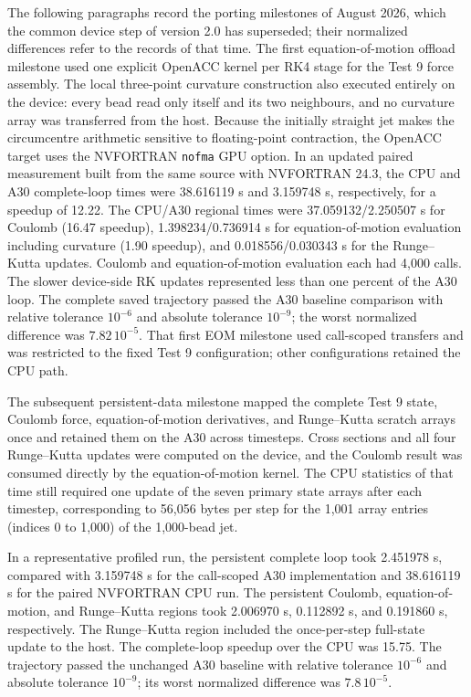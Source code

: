 The following paragraphs record the porting milestones of August 2026,
which the common device step of version 2.0 has superseded; their normalized
differences refer to the records of that time. The first
equation-of-motion offload milestone used one explicit OpenACC
kernel per RK4 stage for the Test 9 force assembly. The local three-point
curvature construction also executed entirely on the device: every bead read
only itself and its two neighbours, and no curvature array was transferred from
the host. Because the initially straight jet makes the circumcentre arithmetic
sensitive to floating-point contraction, the OpenACC target uses the
NVFORTRAN \texttt{nofma} GPU option. In an updated paired measurement built
from the same source with NVFORTRAN 24.3, the CPU and A30 complete-loop times
were 38.616119 s and 3.159748 s, respectively, for a speedup of 12.22. The
CPU/A30 regional times were 37.059132/2.250507 s for Coulomb (16.47 speedup),
1.398234/0.736914 s for equation-of-motion evaluation including curvature
(1.90 speedup), and 0.018556/0.030343 s for the Runge--Kutta updates. Coulomb
and equation-of-motion evaluation each had 4,000 calls. The slower device-side
RK updates represented less than one percent of the A30 loop. The complete
saved trajectory passed the
A30 baseline comparison with relative tolerance $10^{-6}$ and absolute
tolerance $10^{-9}$; the worst normalized difference was $7.82\,10^{-5}$.
That first EOM milestone used call-scoped transfers and was restricted to the fixed Test 9
configuration; other configurations retained the CPU path.

The subsequent persistent-data milestone mapped the complete Test 9 state,
Coulomb force, equation-of-motion derivatives, and Runge--Kutta scratch arrays
once and retained them on the A30 across timesteps. Cross sections and all four
Runge--Kutta updates were computed on the device, and the Coulomb result was
consumed directly by the equation-of-motion kernel. The CPU statistics of
that time still required one update of the seven primary state arrays after
each timestep, corresponding to 56,056 bytes per step for the 1,001 array
entries (indices 0 to 1,000) of the 1,000-bead jet.

In a representative profiled run, the persistent complete loop took 2.451978
s, compared with 3.159748 s for the call-scoped A30 implementation and
38.616119 s for the paired NVFORTRAN CPU run. The persistent Coulomb,
equation-of-motion, and Runge--Kutta regions took 2.006970 s, 0.112892 s, and
0.191860 s, respectively. The Runge--Kutta region included the once-per-step
full-state update to the host. The complete-loop speedup over the CPU was
15.75. The trajectory passed the unchanged A30 baseline with relative
tolerance $10^{-6}$ and absolute tolerance $10^{-9}$; its worst normalized
difference was $7.8\,10^{-5}$.

